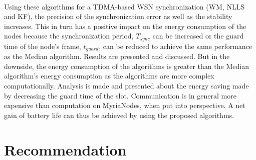 \documentclass[a4paper,10pt]{report}
\begin{document}
\paragraph*{}
Using these algorithms for a TDMA-based WSN synchronization (WM, NLLS and KF), the precision of the synchronization error as well as the stability increases. This in turn has a positive impact on the energy consumption of the nodes because the synchronization period, $T_{sync}$ can be increased or the guard time of the node's frame, $t_{guard}$, can be reduced to achieve the same performance as the Median algorithm. Results are presented and discussed. But in the downside, the energy consumption of the algorithms is greater than the Median algorithm's energy consumption as the algorithms are more complex computationally. Analysis is made and presented about the energy saving made by decreasing the guard time of the slot. Communication is in general more expensive than computation on MyriaNodes, when put into perspective. A net gain of battery life can thus be achieved by using the proposed algorithms.
\section{\textbf{Recommendation}}
\end{document}
